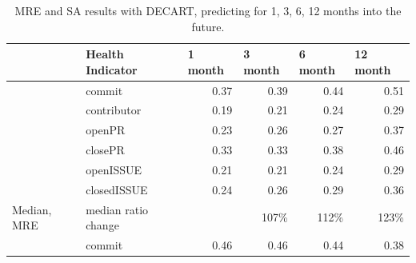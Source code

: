 \documentclass[smallextended]{svjour3}
\begin{document}
\begin{table}[!t]
\centering
\caption{MRE and SA results with DECART, predicting for 1, 3, 6, 12 months
into the future.}
\label{tbl:change}
\begin{adjustbox}{max width=0.96\textwidth}     
\begin{tabular}{llrrrr}
                              & Health Indicator                            & \multicolumn{1}{l}{1 month}                  & \multicolumn{1}{l}{3 month}   & \multicolumn{1}{l}{6 month}   & \multicolumn{1}{l}{12 month}  \\ \hline
                              & commit                                      & 0.37                                         & 0.39                          & 0.44                          & 0.51                          \\
                              & contributor                                 & 0.19                                         & 0.21                          & 0.24                          & 0.29                          \\
                              & openPR                                      & 0.23                                         & 0.26                          & 0.27                          & 0.37                          \\
                              & closePR                                     & 0.33                                         & 0.33                          & 0.38                          & 0.46                          \\
                              & openISSUE                                   & 0.21                                         & 0.21                          & 0.24                          & 0.29                          \\
                              & closedISSUE                                 & 0.24                                         & 0.26                          & 0.29                          & 0.36                          \\
\multirow{-7}{*}{Median, MRE} & \cellcolor[HTML]{CCCCCC}median ratio change & \multicolumn{1}{l}{\cellcolor[HTML]{CCCCCC}} & \cellcolor[HTML]{CCCCCC}107\% & \cellcolor[HTML]{CCCCCC}112\% & \cellcolor[HTML]{CCCCCC}123\% \\ \hline
                              & commit                                      & 0.46                                         & 0.46                          & 0.44                          & 0.38                          \\

\end{tabular}
\end{adjustbox}
\end{table}
\end{document}
